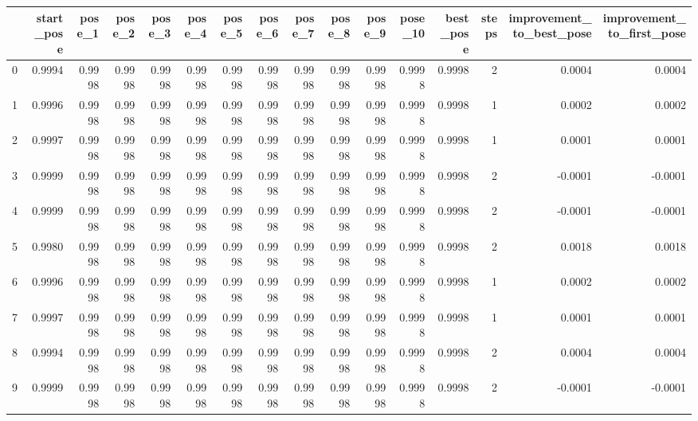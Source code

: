 \begin{tabular}{lrrrrrrrrrrrrrrr}
\toprule
{} &  start\_pose &  pose\_1 &  pose\_2 &  pose\_3 &  pose\_4 &  pose\_5 &  pose\_6 &  pose\_7 &  pose\_8 &  pose\_9 &  pose\_10 &  best\_pose &  steps &  improvement\_to\_best\_pose &  improvement\_to\_first\_pose \\
\midrule
0   &      0.9994 &  0.9998 &  0.9998 &  0.9998 &  0.9998 &  0.9998 &  0.9998 &  0.9998 &  0.9998 &  0.9998 &   0.9998 &     0.9998 &      2 &                    0.0004 &                     0.0004 \\
1   &      0.9996 &  0.9998 &  0.9998 &  0.9998 &  0.9998 &  0.9998 &  0.9998 &  0.9998 &  0.9998 &  0.9998 &   0.9998 &     0.9998 &      1 &                    0.0002 &                     0.0002 \\
2   &      0.9997 &  0.9998 &  0.9998 &  0.9998 &  0.9998 &  0.9998 &  0.9998 &  0.9998 &  0.9998 &  0.9998 &   0.9998 &     0.9998 &      1 &                    0.0001 &                     0.0001 \\
3   &      0.9999 &  0.9998 &  0.9998 &  0.9998 &  0.9998 &  0.9998 &  0.9998 &  0.9998 &  0.9998 &  0.9998 &   0.9998 &     0.9998 &      2 &                   -0.0001 &                    -0.0001 \\
4   &      0.9999 &  0.9998 &  0.9998 &  0.9998 &  0.9998 &  0.9998 &  0.9998 &  0.9998 &  0.9998 &  0.9998 &   0.9998 &     0.9998 &      2 &                   -0.0001 &                    -0.0001 \\
5   &      0.9980 &  0.9998 &  0.9998 &  0.9998 &  0.9998 &  0.9998 &  0.9998 &  0.9998 &  0.9998 &  0.9998 &   0.9998 &     0.9998 &      2 &                    0.0018 &                     0.0018 \\
6   &      0.9996 &  0.9998 &  0.9998 &  0.9998 &  0.9998 &  0.9998 &  0.9998 &  0.9998 &  0.9998 &  0.9998 &   0.9998 &     0.9998 &      1 &                    0.0002 &                     0.0002 \\
7   &      0.9997 &  0.9998 &  0.9998 &  0.9998 &  0.9998 &  0.9998 &  0.9998 &  0.9998 &  0.9998 &  0.9998 &   0.9998 &     0.9998 &      1 &                    0.0001 &                     0.0001 \\
8   &      0.9994 &  0.9998 &  0.9998 &  0.9998 &  0.9998 &  0.9998 &  0.9998 &  0.9998 &  0.9998 &  0.9998 &   0.9998 &     0.9998 &      2 &                    0.0004 &                     0.0004 \\
9   &      0.9999 &  0.9998 &  0.9998 &  0.9998 &  0.9998 &  0.9998 &  0.9998 &  0.9998 &  0.9998 &  0.9998 &   0.9998 &     0.9998 &      2 &                   -0.0001 &                    -0.0001 \\

\end{tabular}
